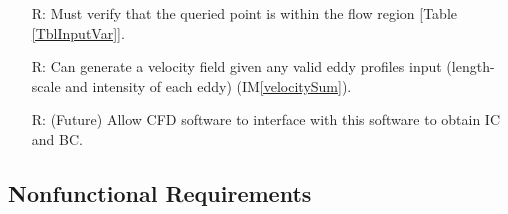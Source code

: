 \documentclass[12pt]{article}
\newcommand{\iref}[1]{IM\ref{#1}}
\newcounter{reqnum} %
\begin{document}
\noindent \begin{itemize}

\item[R\refstepcounter{reqnum}\thereqnum \label{R_inputs}:] Must verify that the queried point is within the flow region [Table \ref{TblInputVar}].


\item[R\refstepcounter{reqnum}\thereqnum \label{R_anyEddy}:] Can generate a velocity field given any valid eddy profiles input (length-scale and intensity of each eddy) (\iref{velocitySum}).

\item[R\refstepcounter{reqnum}\thereqnum \label{R_CFD}:] (Future) Allow CFD software to interface with this software to obtain IC and BC.


\end{itemize}


\subsection{Nonfunctional Requirements}

\end{document}
